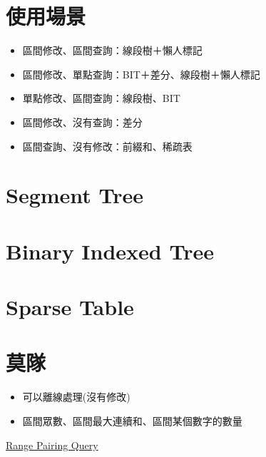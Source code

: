 \documentclass[a4paper]{article}
\title{\Title}
\author{\Author}
\date{\Date}
\begin{document}
\begin{CJK*}{UTF8}{bkai}

    \maketitle
    \thispagestyle{empty}
    \newpage


    \newpage

    \tableofcontents

    \newpage


    \newpage
    \section{使用場景}
    \begin{itemize}
        \item 區間修改、區間查詢：線段樹＋懶人標記
        \item 區間修改、單點查詢：BIT＋差分、線段樹＋懶人標記
        \item 單點修改、區間查詢：線段樹、BIT
        \item 區間修改、沒有查詢：差分
        \item 區間查詢、沒有修改：前綴和、稀疏表
    \end{itemize}

    \newpage
    \section{Segment Tree}
    

    \newpage
    \section{Binary Indexed Tree}

    \newpage
    \section{Sparse Table}

    \newpage
    \section{莫隊}
    \begin{itemize}
        \item 可以離線處理(沒有修改)
        \item 區間眾數、區間最大連續和、區間某個數字的數量
    \end{itemize}
    \href{https://atcoder.jp/contests/abc242/tasks/abc242_g}{Range Pairing Query}
    


\end{CJK*}
\end{document}

